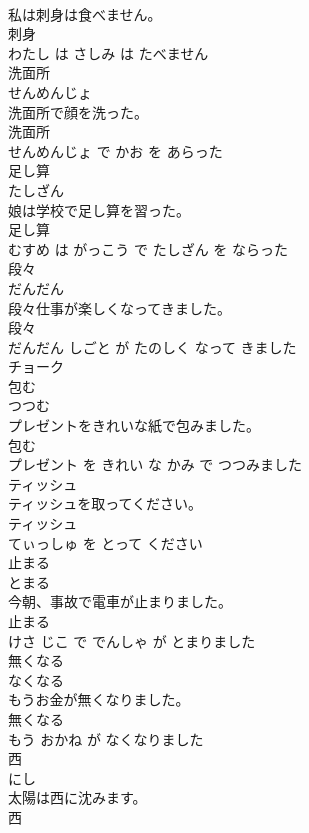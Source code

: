 \documentclass[8pt]{extreport}
\begin{document}
\begin{CJK}{UTF8}{min}
\\	私は刺身は食べません。	
\\	刺身 
\\	わたし は さしみ は たべません			
\\	洗面所	
\\	せんめんじょ			
\\	洗面所で顔を洗った。	
\\	洗面所 
\\	せんめんじょ で かお を あらった			
\\	足し算	
\\	たしざん			
\\	娘は学校で足し算を習った。	
\\	足し算 
\\	むすめ は がっこう で たしざん を ならった			
\\	段々	
\\	だんだん			
\\	段々仕事が楽しくなってきました。	
\\	段々 
\\	だんだん しごと が たのしく なって きました			
\\	チョーク	
\\	包む	
\\	つつむ			
\\	プレゼントをきれいな紙で包みました。	
\\	包む 
\\	プレゼント を きれい な かみ で つつみました			
\\	ティッシュ	
\\	ティッシュを取ってください。	
\\	ティッシュ 
\\	てぃっしゅ を とって ください			
\\	止まる	
\\	とまる			
\\	今朝、事故で電車が止まりました。	
\\	止まる 
\\	けさ じこ で でんしゃ が とまりました			
\\	無くなる	
\\	なくなる			
\\	もうお金が無くなりました。	
\\	無くなる 
\\	もう おかね が なくなりました			
\\	西	
\\	にし			
\\	太陽は西に沈みます。	
\\	西 

\end{CJK}
\end{document}
